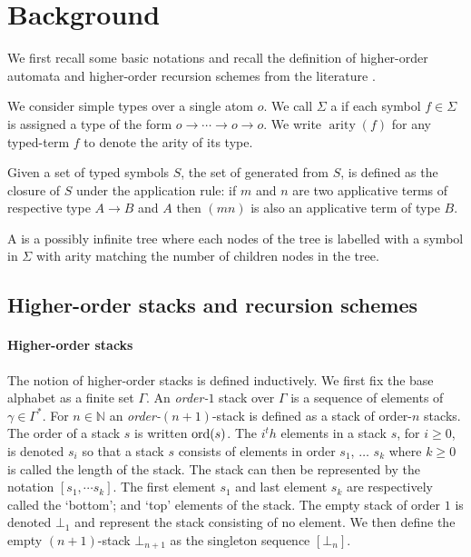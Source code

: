 \documentclass[a4paper,draft]{article}[12pt]
\theoremstyle{remark}
\theoremstyle{definition}
\newcommand\arity{\mathop{\mathrm{arity}}}
\begin{document}
\section{Background}
We first recall some basic notations and recall the definition of higher-order automata and higher-order recursion schemes from the literature \cite{KNU02,hague-collaps-full}.

We consider simple types over a single atom $o$. We call $\Sigma$ a  if each symbol $f \in \Sigma$ is assigned a type of the form $o \longrightarrow  \cdots \longrightarrow o \longrightarrow  o$. We write $\arity(f)$ for any typed-term $f$ to denote the arity of its type.

Given a set of typed symbols $S$, the set of  generated from $S$, is defined as the closure of $S$ under the application rule: if $m$ and $n$ are two applicative terms of respective type $A\rightarrow B$ and $A$ then $(m n)$ is also an applicative term of type $B$.

A  is a possibly infinite tree where each nodes of the tree is labelled with a symbol in $\Sigma$ with arity matching the number of children nodes in the tree.


\subsection{Higher-order stacks and recursion schemes}

\paragraph{Higher-order stacks}
The notion of higher-order stacks is defined inductively. We first fix the base alphabet as a finite set $\Gamma$. An \emph{order-$1$} stack over $\Gamma$ is a sequence of elements of $\gamma \in \Gamma^*$. For $n \in \mathbb{N}$ an \emph{order-$(n+1)$}-stack is defined as a stack of order-$n$ stacks.
The order of a stack $s$ is written $\mathop{\mathrm{ord}}(s)$. The $i^th$ elements in a stack $s$, for $i\geq 0$, is denoted $s_i$ so that a stack $s$ consists of elements in order $s_1$, $\dots$ $s_k$ where $k\geq0$ is called the length of the stack. The stack can then be represented by the notation $[s_1, \cdots s_k]$. The first element $s_1$ and last element $s_k$ are respectively called the `bottom'; and `top' elements of the stack.
The empty stack of order $1$ is denoted $\bot_1$ and represent the stack consisting of no element. We then define the empty $(n+1)$-stack $\bot_{n+1}$ as the singleton sequence $[ \bot_n ]$.
\end{document}
